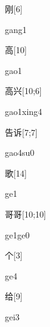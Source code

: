 \begin{verbete}[gang1]{刚}[6]
\begin{pronuncia}{gang1}
\end{pronuncia}
\end{verbete}

\begin{verbete}[gao1]{高}[10]
\begin{pronuncia}{gao1}
\end{pronuncia}
\end{verbete}

\begin{verbete}{高兴}[10;6]
\begin{pronuncia}{gao1xing4}
\end{pronuncia}
\end{verbete}

\begin{verbete}[gao4su0]{告诉}[7;7]
\begin{pronuncia}{gao4su0}
\end{pronuncia}
\end{verbete}

\begin{verbete}[ge1]{歌}[14]
\begin{pronuncia}{ge1}
\end{pronuncia}
\end{verbete}

\begin{verbete}[ge1ge0]{哥哥}[10;10]
\begin{pronuncia}{ge1ge0}
\end{pronuncia}
\end{verbete}

\begin{verbete}[ge4]{个}[3]
\begin{pronuncia}{ge4}
\end{pronuncia}
\end{verbete}

\begin{verbete}[gei3]{给}[9]
\begin{pronuncia}{gei3}
\end{pronuncia}
\end{verbete}


